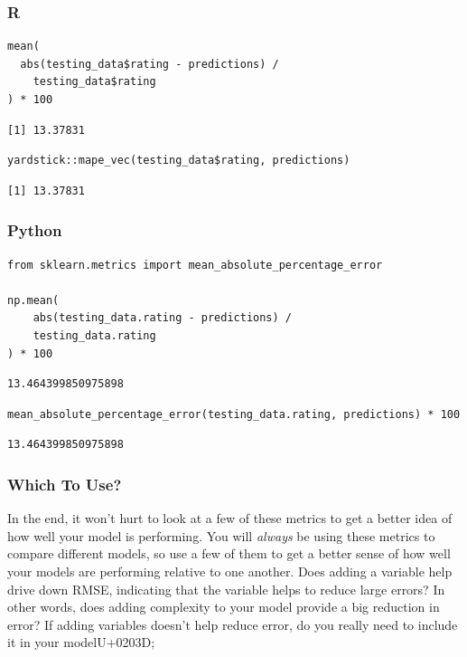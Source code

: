 \documentclass[
  letterpaper,
]{krantz}
\begin{document}
\subsubsection{R}

\begin{verbatim}
mean(
  abs(testing_data$rating - predictions) / 
    testing_data$rating
) * 100
\end{verbatim}

\begin{verbatim}
[1] 13.37831
\end{verbatim}

\begin{verbatim}
yardstick::mape_vec(testing_data$rating, predictions)
\end{verbatim}

\begin{verbatim}
[1] 13.37831
\end{verbatim}

\subsubsection{Python}

\begin{verbatim}
from sklearn.metrics import mean_absolute_percentage_error

np.mean(
    abs(testing_data.rating - predictions) / 
    testing_data.rating
) * 100
\end{verbatim}

\begin{verbatim}
13.464399850975898
\end{verbatim}

\begin{verbatim}
mean_absolute_percentage_error(testing_data.rating, predictions) * 100
\end{verbatim}

\begin{verbatim}
13.464399850975898
\end{verbatim}

\subsubsection{Which To Use?}\label{which-to-use}

In the end, it won't hurt to look at a few of these metrics to get a
better idea of how well your model is performing. You will \emph{always}
be using these metrics to compare different models, so use a few of them
to get a better sense of how well your models are performing relative to
one another. Does adding a variable help drive down RMSE, indicating
that the variable helps to reduce large errors? In other words, does
adding complexity to your model provide a big reduction in error? If
adding variables doesn't help reduce error, do you really need to
include it in your modelU+0203D;
\end{document}
